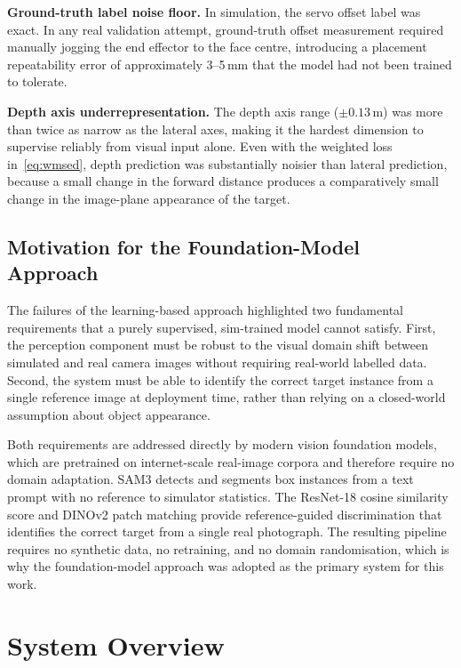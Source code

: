 \documentclass[lettersize,journal]{IEEEtran}
\begin{document}
\textbf{Ground-truth label noise floor.}
In simulation, the servo offset label was exact.  In any real validation
attempt, ground-truth offset measurement required manually jogging the
end effector to the face centre, introducing a placement repeatability
error of approximately 3--5\,mm that the model had not been trained to
tolerate.

\textbf{Depth axis underrepresentation.}
The depth axis range ($\pm 0.13$\,m) was more than twice as narrow as the
lateral axes, making it the hardest dimension to supervise reliably from
visual input alone.  Even with the weighted loss in~\eqref{eq:wmsed},
depth prediction was substantially noisier than lateral prediction,
because a small change in the forward distance produces a comparatively
small change in the image-plane appearance of the target.

\subsection{Motivation for the Foundation-Model Approach}

The failures of the learning-based approach highlighted two fundamental
requirements that a purely supervised, sim-trained model cannot satisfy.
First, the perception component must be robust to the visual domain shift
between simulated and real camera images without requiring real-world
labelled data.  Second, the system must be able to identify the correct
target instance from a single reference image at deployment time, rather
than relying on a closed-world assumption about object appearance.

Both requirements are addressed directly by modern vision foundation
models, which are pretrained on internet-scale real-image corpora and
therefore require no domain adaptation.  SAM3 detects and segments box
instances from a text prompt with no reference to simulator statistics.
The ResNet-18 cosine similarity score and DINOv2 patch matching provide
reference-guided discrimination that identifies the correct target from a
single real photograph.  The resulting pipeline requires no synthetic
data, no retraining, and no domain randomisation, which is why the
foundation-model approach was adopted as the primary system for this work.


\section{System Overview}
\label{sec:system}
\end{document}
